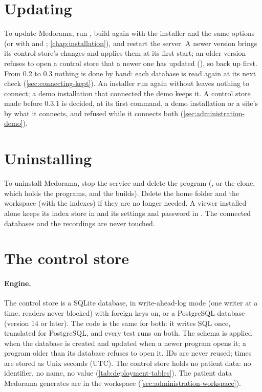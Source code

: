 \section{Updating}
\label{sec:deployment-update}

To update Medorama, run , build again with the installer and the same options (or
with  and ;
\cref{chap:installation}), and restart the server. A newer version brings its control store's
changes and applies them at its first start; an older version refuses to open a control store
that a newer one has updated (), so back up first. From 0.2 to 0.3 nothing is done by hand: each database is read
again at its next check (\cref{sec:connecting-kept}). An installer run again without  leaves
 nothing to connect; a demo installation that connected the demo keeps
it. A control store made before 0.3.1 is decided, at its first command, a demo installation or a
site's by what it connects, and refused while it connects both (\cref{sec:administration-demo}).

\section{Uninstalling}
\label{sec:deployment-uninstall}

To uninstall Medorama, stop the service and delete the program (,
or the clone, which holds the programs,  and the builds). Delete the home folder
and the workspace (with the indexes) if they are no longer needed. A viewer installed alone keeps its index store in
 and its settings and password in
. The connected databases and the recordings are never touched.

\section{The control store}
\label{sec:deployment-database}

\paragraph{Engine.} The control store is a SQLite database, in write-ahead-log mode (one writer
at a time, readers never blocked) with foreign keys on, or a PostgreSQL database (version 14 or
later). The code is the same for both: it writes SQL once, translated for PostgreSQL, and every
test runs on both. The schema is applied when the database is created and updated when a newer
program opens it; a program older than its database refuses to open it. IDs are never reused;
times are stored as Unix seconds (UTC). The control store holds no patient data: no identifier,
no name, no value (\cref{tab:deployment-tables}). The patient data Medorama generates are in the
workspace (\cref{sec:administration-workspace}).

